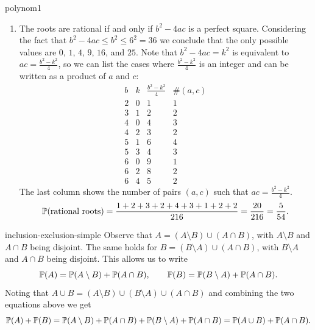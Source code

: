 \begin{sol}{polynom1}
\begin{enumerate}
\begin{align*}
            \quad\Longrightarrow\quad 1+2+2+3+2+4+2+1=17
        \end{align*}
        The number of favorable outcomes is $1+3+8+14+17=43$, so $\PP(A)=\frac{43}{216}\approx0.2$.
        \item[(b)] The roots are rational if and only if $b^2-4ac$ is a perfect square. Considering the fact that $b^2-4ac\le b^2\le6^2=36$ we conclude that the only possible values are $0$, $1$, $4$, $9$, $16$, and $25$. Note that $b^2-4ac=k^2$ is equivalent to $ac=\frac{b^2-k^2}{4}$, so we can list the cases where $\frac{b^2-k^2}{4}$ is an integer and can be written as a product of $a$ and $c$:
        \[
        \begin{array}{c|c|c|c}
            b & k & \frac{b^2-k^2}{4} & \#(a,c) \\
            \hline
            2 & 0 & 1 & 1 \\
            3 & 1 & 2 & 2 \\
            4 & 0 & 4 & 3 \\
            4 & 2 & 3 & 2 \\
            5 & 1 & 6 & 4 \\
            5 & 3 & 4 & 3 \\
            6 & 0 & 9 & 1 \\
            6 & 2 & 8 & 2 \\
            6 & 4 & 5 & 2
        \end{array}
        \]
        The last column shows the number of pairs $(a,c)$ such that $ac=\frac{b^2-k^2}{4}$.
        \[
            \mathbb{P}(\text{rational roots})=\frac{1+2+3+2+4+3+1+2+2}{216}=\frac{20}{216}=\frac{5}{54}.
        \]
    \end{enumerate}
\end{sol}

\begin{sol}{inclusion-exclusion-simple}
    Observe that $A=(A\setminus B)\cup(A\cap B)$, with $A\setminus B$ and $A\cap B$ being disjoint. The same holds for $B=(B\setminus A)\cup(A\cap B)$, with $B\setminus A$ and $A\cap B$ being disjoint. This allows us to write
    \[
        \mathbb{P}(A)=\mathbb{P}(A\setminus B)+\mathbb{P}(A\cap B),\qquad\mathbb{P}(B)=\mathbb{P}(B\setminus A)+\mathbb{P}(A\cap B).
    \]
    Noting that $A\cup B=(A\setminus B)\cup(B\setminus A)\cup(A\cap B)$ and combining the two equations above we get
    \[
        \mathbb{P}(A)+\mathbb{P}(B)=\mathbb{P}(A\setminus B)+\mathbb{P}(A\cap B)+\mathbb{P}(B\setminus A)+\mathbb{P}(A\cap B)=\mathbb{P}(A\cup B)+\mathbb{P}(A\cap B).
    \]
\end{sol}


